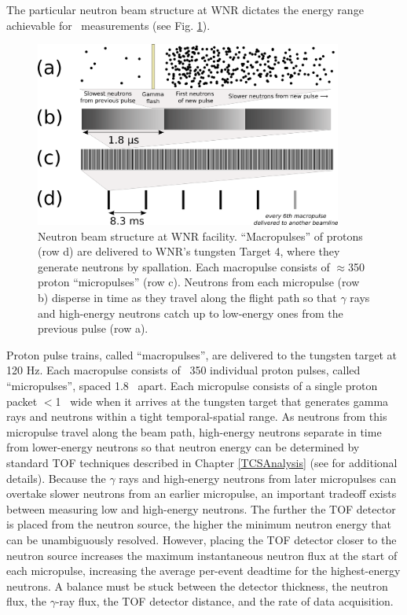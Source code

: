 The particular neutron beam structure at WNR dictates the energy range
achievable for \tot\ measurements (see Fig. \ref{BeamStructure}).
\begin{figure}[tb]
    \centering
    \includegraphics[width=0.9\textwidth]{figures/beamStructure.png}
    \caption[Pulsed structure of the neutron beam at the WNR facility]
    {
        Neutron beam structure at WNR facility.
        ``Macropulses'' of protons (row d) are delivered to
        WNR's tungsten Target 4, where they generate neutrons by spallation.
        Each macropulse consists of
        $\approx$350 proton ``micropulses'' (row c). Neutrons
        from each micropulse (row b) disperse in
        time as they travel along the flight path so that $\gamma$ rays and high-energy 
        neutrons catch up to low-energy ones from the previous pulse (row a).
    }
    \label{BeamStructure}
\end{figure}
Proton pulse trains, called ``macropulses'', are delivered to the tungsten target at 120 Hz.
Each macropulse consists of ~350 individual proton pulses, called
``micropulses'', spaced 1.8 \micro\second\ apart.
Each micropulse consists of a single proton packet $<$1 \nano\second\ wide when it 
arrives at the tungsten target that generates gamma rays and neutrons within a tight
temporal-spatial range. As neutrons from this micropulse travel along the beam path, 
high-energy neutrons separate in time from lower-energy neutrons so that neutron
energy can be determined by standard TOF techniques described in Chapter
\ref{TCSAnalysis} (see \cite{Moore1980} for additional details).
Because the $\gamma$ rays and high-energy neutrons from later micropulses can
overtake slower neutrons from an earlier micropulse, an important tradeoff
exists between measuring low and high-energy neutrons. The further the TOF
detector is placed from the neutron source, the higher the minimum neutron energy that can be 
unambiguously resolved. However, placing the TOF detector closer to the neutron source
increases the maximum instantaneous neutron flux at the start of each
micropulse, increasing the average per-event deadtime for the highest-energy
neutrons. A balance must be stuck between the detector thickness, the neutron
flux, the $\gamma$-ray flux, the TOF detector distance, and the rate
of data acquisition.


